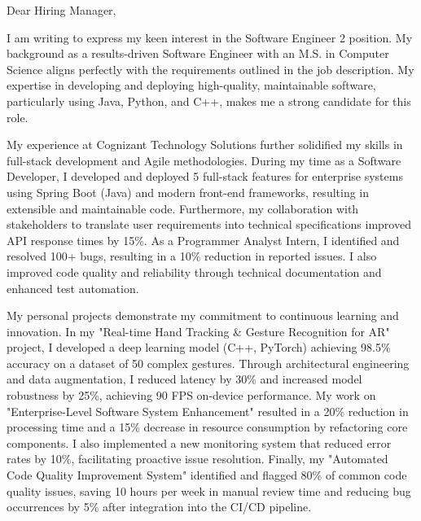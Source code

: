\documentclass[letterpaper,11pt]{article}
\begin{document}
\begin{flushleft}
Dear Hiring Manager,

\vspace{12pt}

I am writing to express my keen interest in the Software Engineer 2 position.  My background as a results-driven Software Engineer with an M.S. in Computer Science aligns perfectly with the requirements outlined in the job description. My expertise in developing and deploying high-quality, maintainable software, particularly using Java, Python, and C++, makes me a strong candidate for this role.

\vspace{12pt}

My experience at Cognizant Technology Solutions further solidified my skills in full-stack development and Agile methodologies.  During my time as a Software Developer, I developed and deployed 5 full-stack features for enterprise systems using Spring Boot (Java) and modern front-end frameworks, resulting in extensible and maintainable code.  Furthermore, my collaboration with stakeholders to translate user requirements into technical specifications improved API response times by 15\%. As a Programmer Analyst Intern, I identified and resolved 100+ bugs, resulting in a 10\% reduction in reported issues. I also improved code quality and reliability through technical documentation and enhanced test automation.


\vspace{12pt}

My personal projects demonstrate my commitment to continuous learning and innovation.  In my "Real-time Hand Tracking & Gesture Recognition for AR" project, I developed a deep learning model (C++, PyTorch) achieving 98.5\% accuracy on a dataset of 50 complex gestures.  Through architectural engineering and data augmentation, I reduced latency by 30\% and increased model robustness by 25\%, achieving 90 FPS on-device performance.  My work on "Enterprise-Level Software System Enhancement" resulted in a 20\% reduction in processing time and a 15\% decrease in resource consumption by refactoring core components.  I also implemented a new monitoring system that reduced error rates by 10\%, facilitating proactive issue resolution. Finally, my "Automated Code Quality Improvement System" identified and flagged 80\% of common code quality issues, saving 10 hours per week in manual review time and reducing bug occurrences by 5\% after integration into the CI/CD pipeline.



\end{flushleft}
\end{document}
